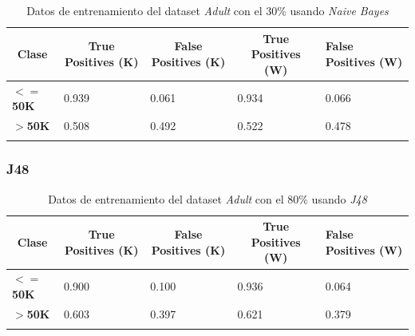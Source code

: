 \documentclass[10pt,a4paper]{article}
\begin{document}
\begin{table}[h!]
\begin{tabular}{lllll}
\hline
\multicolumn{1}{|c|}{\textbf{Clase}} & \multicolumn{1}{c|}{\textbf{True Positives (K)}} & \multicolumn{1}{c|}{\textbf{False Positives (K)}} & \multicolumn{1}{c|}{\textbf{True Positives (W)}} & \multicolumn{1}{l|}{\textbf{False Positives (W)}} \\ \hline
\multicolumn{1}{|l|}{\textbf{$<=$50K}} & \multicolumn{1}{l|}{0.939}          & \multicolumn{1}{l|}{0.061}          & \multicolumn{1}{l|}{0.934}          & \multicolumn{1}{l|}{0.066} \\ \hline
\multicolumn{1}{|l|}{\textbf{$>$50K}} & \multicolumn{1}{l|}{0.508}          & \multicolumn{1}{l|}{0.492}          & \multicolumn{1}{l|}{0.522}          & \multicolumn{1}{l|}{0.478} \\ \hline
\textbf{}                       &                                &                                &                                &                      
\end{tabular}
\caption{Datos de entrenamiento del dataset \emph{Adult} con el 30\% usando \emph{Naive Bayes}}
\label{tab:adult_bayes_30}
\end{table}

\newpage
\subsubsection{J48}

\begin{table}[h]
\begin{tabular}{lllll}
\hline
\multicolumn{1}{|c|}{\textbf{Clase}} & \multicolumn{1}{c|}{\textbf{True Positives (K)}} & \multicolumn{1}{c|}{\textbf{False Positives (K)}} & \multicolumn{1}{c|}{\textbf{True Positives (W)}} & \multicolumn{1}{l|}{\textbf{False Positives (W)}} \\ \hline
\multicolumn{1}{|l|}{\textbf{$<=$50K}} & \multicolumn{1}{l|}{0.900}          & \multicolumn{1}{l|}{0.100}          & \multicolumn{1}{l|}{0.936}          & \multicolumn{1}{l|}{0.064} \\ \hline
\multicolumn{1}{|l|}{\textbf{$>$50K}} & \multicolumn{1}{l|}{0.603}          & \multicolumn{1}{l|}{0.397}          & \multicolumn{1}{l|}{0.621}          & \multicolumn{1}{l|}{0.379} \\ \hline
\textbf{}                       &                                &                                &                                &                      
\end{tabular}
\caption{Datos de entrenamiento del dataset \emph{Adult} con el 80\% usando \emph{J48}}
\label{tab:adult_j48_80}
\end{table}
\end{document}
